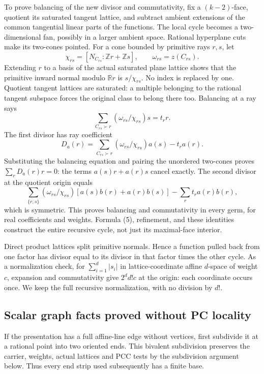 \documentclass[
  11pt,
]{article}
\begin{document}
To prove balancing of the new divisor and commutativity, fix a
\((k-2)\)-face, quotient its saturated tangent lattice, and subtract
ambient extensions of the common tangential linear parts of the
functions. The local cycle becomes a two-dimensional fan, possibly in a
larger ambient space. Rational hyperplane cuts make its two-cones
pointed. For a cone bounded by primitive rays \(r,s\), let \[
 \chi_{rs}=[N_{C_{rs}}:\mathbb{Z}r+\mathbb{Z}s],\qquad \omega_{rs}=z(C_{rs}).
\] Extending \(r\) to a basis of the actual saturated plane lattice
shows that the primitive inward normal modulo \(\mathbb{R}r\) is
\(s/\chi_{rs}\). No index is replaced by one. Quotient tangent lattices
are saturated: a multiple belonging to the rational tangent subspace
forces the original class to belong there too. Balancing at a ray says
\[
 \sum_{C_{rs}\succ r}(\omega_{rs}/\chi_{rs})s=t_r r.
\] The first divisor has ray coefficient \[
 D_a(r)=\sum_{C_{rs}\succ r}(\omega_{rs}/\chi_{rs})a(s)-t_r a(r).
\] Substituting the balancing equation and pairing the unordered
two-cones proves \(\sum_rD_a(r)r=0\): the terms \(a(s)r+a(r)s\) cancel
exactly. The second divisor at the quotient origin equals \[
 \sum_{\{r,s\}}(\omega_{rs}/\chi_{rs})[a(s)b(r)+a(r)b(s)]
                  -\sum_rt_ra(r)b(r),                       \tag{6}
\] which is symmetric. This proves balancing and commutativity in every
germ, for real coefficients and weights. Formula (5), refinement, and
these identities construct the entire recursive cycle, not just its
maximal-face interior.

Direct product lattices split primitive normals. Hence a function pulled
back from one factor has divisor equal to its divisor in that factor
times the other cycle. As a normalization check, for
\(\sum_{i=1}^d|s_i|\) in lattice-coordinate affine \(d\)-space of weight
\(c\), expansion and commutativity give \(2^d d!c\) at the origin: each
coordinate occurs once. We keep the full recursive normalization, with
no division by \(d!\).

\subsection{Scalar graph facts proved without PC
locality}\label{scalar-graph-facts-proved-without-pc-locality}

If the presentation has a full affine-line edge without vertices, first
subdivide it at a rational point into two oriented ends. This bivalent
subdivision preserves the carrier, weights, actual lattices and PCC tests
by the subdivision argument below. Thus every end strip used subsequently
has a finite base.
\end{document}
